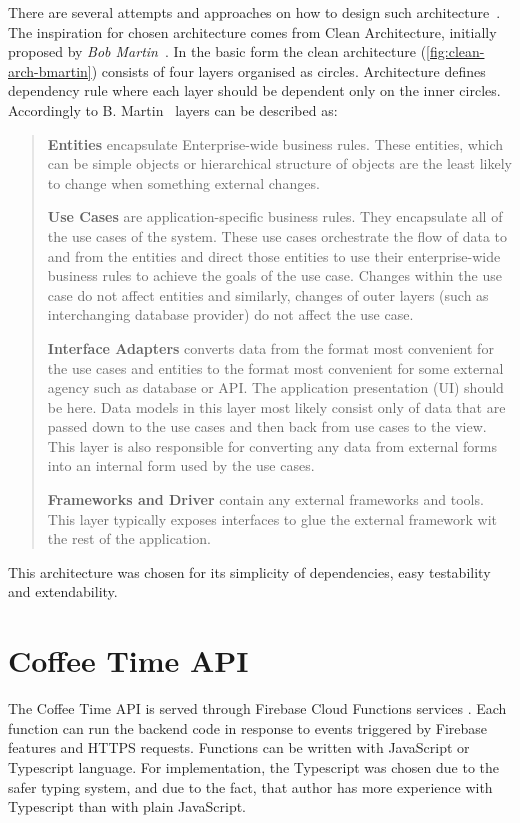 There are several attempts and approaches on how to design such architecture~\cite{clean-architecture-article}. The inspiration for chosen architecture comes from Clean Architecture, initially proposed by \textit{Bob Martin}~\cite{clean-architecture-book}. In the basic form the clean architecture (\cref{fig:clean-arch-bmartin}) consists of four layers organised as circles. Architecture defines dependency rule where each layer should be dependent only on the inner circles. Accordingly to B. Martin~\cite{clean-architecture-article} layers can be described as:  

\begin{quote}
\textbf{Entities} encapsulate Enterprise-wide business rules. These entities, which can be simple objects or hierarchical structure of objects are the least likely to change when something external changes.

\textbf{Use Cases} are application-specific business rules. They encapsulate all of the use cases of the system. These use cases orchestrate the flow of data to and from the entities and direct those entities to use their enterprise-wide business rules to achieve the goals of the use case. Changes within the use case do not affect entities and similarly, changes of outer layers (such as interchanging database provider) do not affect the use case. 

\textbf{Interface Adapters} converts data from the format most convenient for the use cases and entities to the format most convenient for some external agency such as database or API.  The application presentation (UI) should be here. Data models in this layer most likely consist only of data that are passed down to the use cases and then back from use cases to the view.  This layer is also responsible for converting any data from external forms into an internal form used by the use cases.

\textbf{Frameworks and Driver} contain any external frameworks and tools. This layer typically exposes interfaces to glue the external framework wit the rest of the application. 
\end{quote}

This architecture was chosen for its simplicity of dependencies, easy testability and extendability. 
\section{Coffee Time API}
The Coffee Time API is served through Firebase Cloud Functions services . Each function can run the backend code in response to events triggered by Firebase features and HTTPS requests. Functions can be written with JavaScript or Typescript language. For implementation, the Typescript was chosen due to the safer typing system, and due to the fact, that author has more experience with Typescript than with plain JavaScript. 

